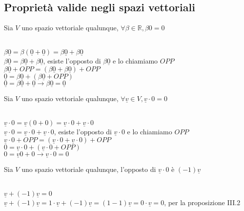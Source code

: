 \subsection{Proprietà valide negli spazi vettoriali}

\begin{proposizione}
	Sia $V$ uno spazio vettoriale qualunque, $\forall\beta\in\mathbb{R}, \beta 0=0$\\
    \begin{dimostrazione}
    	\phantom{}\\
    	$\beta \underline{0}=\beta(\underline{0}+\underline{0})=\beta \underline{0}+\beta \underline{0}$\\
    	$\beta \underline{0}=\beta \underline{0}+\beta \underline{0}$, esiste l'opposto di $\beta \underline{0}$ e lo chiamiamo $OPP$\\
    	$\beta \underline{0}+ OPP=(\beta \underline{0}+\beta \underline{0})+OPP$\\
    	$\underline{0}=\beta \underline{0}+(\beta \underline{0}+OPP)$\\
    	$\underline{0}=\beta \underline{0}+\underline{0}\rightarrow \beta \underline{0}=\underline{0}$
    \end{dimostrazione}
\end{proposizione}

\begin{proposizione}
	Sia $V$ uno spazio vettoriale qualunque, $\forall \underline{v}\in V, \underline{v}\cdot0=0$\\
	\begin{dimostrazione}
		\phantom{}\\
		$\underline{v}\cdot0=\underline{v}(0+0)=\underline{v}\cdot0+\underline{v}\cdot0$\\
		$\underline{v}\cdot0=\underline{v}\cdot0+\underline{v}\cdot0$, esiste l'opposto di $\underline{v}\cdot0$ e lo chiamiamo $OPP$\\
		$\underline{v}\cdot0+ OPP=(\underline{v}\cdot0+\underline{v}\cdot0)+OPP$\\
		$0=\underline{v}\cdot0+(\underline{v}\cdot0+OPP)$\\
		$0=\underline{v} 0+0\rightarrow \underline{v}\cdot0=0$
	\end{dimostrazione}
\end{proposizione}

\begin{proposizione}
	Sia $V$ uno spazio vettoriale qualunque, l'opposto di $\underline{v}\cdot0$ è $(-1)\underline{v}$\\
	\begin{dimostrazione}
		\phantom{}\\
		$\underline{v}+(-1)\underline{v}=0$\\
		$\underline{v}+(-1)\underline{v}=1\cdot \underline{v}+(-1)\underline{v}=(1-1)\underline{v}=0\cdot \underline{v}=0$, per la proposizione III.2
	\end{dimostrazione}
\end{proposizione}

